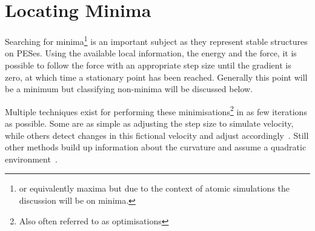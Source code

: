 \section{Locating Minima}
\label{sec:minima}
Searching for minima\footnote{or equivalently maxima but due to the context of atomic simulations the discussion will be on minima.} is an important subject as they represent stable structures on PESes.
Using the available local information, the energy and the force, it is possible to follow the force with an appropriate step size until the gradient is zero, at which time a stationary point has been reached.
Generally this point will be a minimum but classifying non-minima will be discussed below.

Multiple techniques exist for performing these minimisations\footnote{Also often referred to as optimisations} in as few iterations as possible.
Some are as simple as adjusting the step size to simulate velocity, while others detect changes in this fictional velocity and adjust accordingly~\cite{cg-original-1952, fire}.
Still other methods build up information about the curvature and assume a quadratic environment~\cite{lbfgs}.

